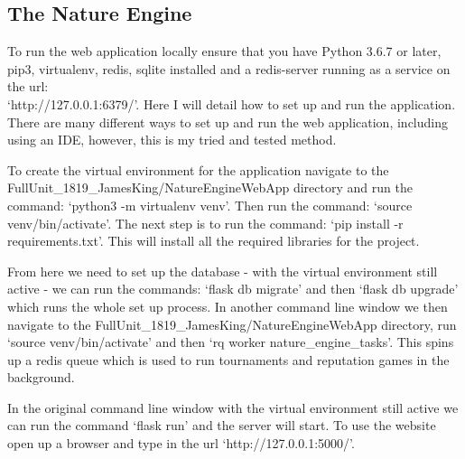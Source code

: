 \documentclass[]{final_report}
\begin{document}
\subsection{The Nature Engine}
To run the web application locally ensure that you have Python 3.6.7 or later, pip3, virtualenv, redis, sqlite installed and a redis-server running as a service on the url:\\ `http://127.0.0.1:6379/'. Here I will detail how to set up and run the application. There are many different ways to set up and run the web application, including using an IDE, however, this is my tried and tested method.\par
To create the virtual environment for the application navigate to the\\ FullUnit\_1819\_JamesKing/NatureEngineWebApp directory and run the command: `python3 -m virtualenv venv'. Then run the command: `source venv/bin/activate'. The next step is to run the command: `pip install -r requirements.txt'. This will install all the required libraries for the project.\par 
From here we need to set up the database - with the virtual environment still active - we can run the commands: `flask db migrate' and then `flask db upgrade' which runs the whole set up process. In another command line window we then navigate to the FullUnit\_1819\_JamesKing/NatureEngineWebApp directory, run `source venv/bin/activate' and then `rq worker nature\_engine\_tasks'. This spins up a redis queue which is used to run tournaments and reputation games in the background.\par 
In the original command line window with the virtual environment still active we can run the command `flask run' and the server will start. To use the website open up a browser and type in the url `http://127.0.0.1:5000/'.
\end{document}
